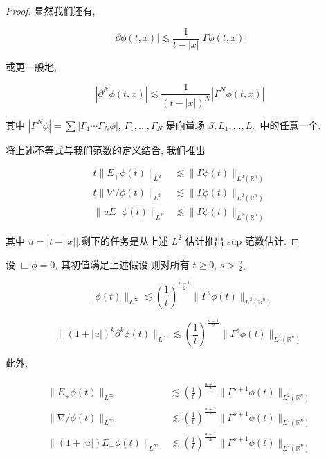 \begin{proof}
显然我们还有,

\[
|\partial\phi(t, x)| \lesssim \frac{1}{t-|x|}|\Gamma\phi(t, x)|
\]

或更一般地,

\begin{equation}
|\partial^N\phi(t, x)| \lesssim \frac{1}{(t-|x|)^N}|\Gamma^N\phi(t, x)|\label{eq:c7-320}
\end{equation}

其中 $|\Gamma^N\phi| = \sum|\Gamma_1\cdots\Gamma_N\phi|$, $\Gamma_1, \ldots, \Gamma_N$ 是向量场 $S, L_1, \ldots, L_n$ 中的任意一个.

将上述不等式与我们范数的定义结合, 我们推出

\[
\begin{aligned}
t\|E_+\phi(t)\|_{L^2} &\lesssim \|\Gamma\phi(t)\|_{L^2(\mathbb{R}^n)} \\
t\|\nabla\!\!\!/\phi(t)\|_{L^2} &\lesssim \|\Gamma\phi(t)\|_{L^2(\mathbb{R}^n)} \\
\|uE_-\phi(t)\|_{L^2} &\lesssim \|\Gamma\phi(t)\|_{L^2(\mathbb{R}^n)}
\end{aligned}
\]

其中 $u = |t-|x||$.剩下的任务是从上述 $L^2$ 估计推出 sup 范数估计.
\end{proof}

\begin{proposition}\label{prop:c7-0.28}
设 $\Box\phi = 0$, 其初值满足上述假设.则对所有 $t\geq 0$, $s > \frac{n}{2}$,

\begin{equation}
\|\phi(t)\|_{L^{\infty}} \lesssim \left(\frac{1}{t}\right)^{\frac{n-1}{2}}\|\Gamma^s\phi(t)\|_{L^2(\mathbb{R}^n)}\label{eq:c7-321}
\end{equation}

\begin{equation}
\|(1+|u|)^k\partial^k\phi(t)\|_{L^{\infty}} \lesssim \left(\frac{1}{t}\right)^{\frac{n-1}{2}}\|\Gamma^s\phi(t)\|_{L^2(\mathbb{R}^n)}\label{eq:c7-322}
\end{equation}

此外,

\[
\begin{aligned}
\|E_+\phi(t)\|_{L^{\infty}} &\lesssim \left(\frac{1}{t}\right)^{\frac{n+1}{2}}\|\Gamma^{s+1}\phi(t)\|_{L^2(\mathbb{R}^n)} \\
\|\nabla\!\!\!/\phi(t)\|_{L^{\infty}} &\lesssim \left(\frac{1}{t}\right)^{\frac{n+1}{2}}\|\Gamma^{s+1}\phi(t)\|_{L^2(\mathbb{R}^n)} \\
\|(1+|u|)E_-\phi(t)\|_{L^{\infty}} &\lesssim \left(\frac{1}{t}\right)^{\frac{n-1}{2}}\|\Gamma^{s+1}\phi(t)\|_{L^2(\mathbb{R}^n)}
\end{aligned}
\]
\end{proposition}

